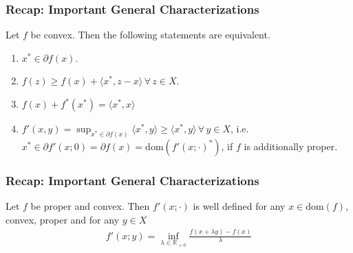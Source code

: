 \documentclass[10pt, hyperref={hidelinks}]{beamer}
\begin{document}
    \begin{frame}
        \frametitle{Recap: Important General Characterizations}

        \begin{theorem} \label{convex_subdifferential_characterizations}
            Let \(f\) be convex. Then the following statements are equivalent.
            \begin{enumerate}[label=(\roman*), wide]
                \item \(x^* \in \partial f(x)\).
                \item \(f(z) \geq f(x) + \langle x^*, z-x \rangle \, \forall \, z \in X\).
                \item \(f(x)+f^*(x^*) = \langle x^*, x \rangle\)
                \item \label{convex_subdifferential_characterizations_4} \(f'(x, y) = \sup_{x^* \in \partial f(x)} \langle x^*, y \rangle \geq \langle x^*, y \rangle \, \forall \, y \in X\), i.e. \(x^* \in \partial f'(x; 0) = \partial f(x) = \text{dom}(f'(x; \cdot)^*)\), if \(f\) is additionally proper.
            \end{enumerate}
        \end{theorem}
    \end{frame}

    \begin{frame}
        \frametitle{Recap: Important General Characterizations}
    
        \begin{theorem}
            Let \(f\) be proper and convex. Then \(f'(x; \cdot)\) is well defined for any \(x \in \text{dom}(f)\), convex, proper and for any \(y \in X\)
            \begin{align*}
                f'(x; y) = \inf_{\lambda \in \mathbb{R}_{> 0}} \frac{f(x+\lambda y)-f(x)}{\lambda}
            \end{align*}
        \end{theorem}
    \end{frame}
\end{document}
